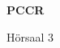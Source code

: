 \documentclass[a4paper]{article}
\begin{document}
\printGenericVSLHeader
\begin{center}
\begin{vsltext}{3cm}{4cm}

   \vspace{0.5cm} 

    \textbf{PCCR} 

    \vspace{1.5cm}

    Hörsaal 3

\end{vsltext}

\end{center}
\end{document}
